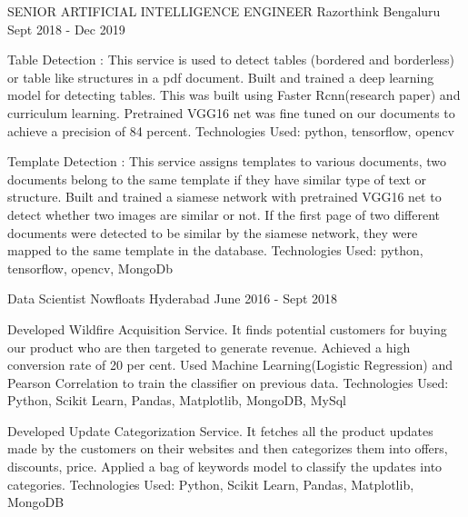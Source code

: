 \begin{cventries}
\vspace{2em} %
  \cventry
    {SENIOR ARTIFICIAL INTELLIGENCE ENGINEER} %
    {Razorthink} %
    {Bengaluru} %
    {Sept 2018 - Dec 2019} %
    {
      \begin{cvitems} %
        \item{Table Detection : This service is used to detect tables (bordered and borderless) or table like structures in a pdf document. Built and trained a deep learning model for detecting tables. This was built using Faster Rcnn(research paper) and curriculum learning. Pretrained VGG16 net was fine tuned on our documents to achieve a precision of 84 percent.  Technologies Used: python, tensorflow, opencv}        
        \item{Template Detection : This service assigns templates to various documents, two documents belong to the same template if they have similar type of text or structure. Built and trained a siamese network with pretrained VGG16 net to detect whether two images are similar or not. If the first page of two different documents were detected to be similar by the siamese network, they were mapped to the same template in the database. Technologies Used: python, tensorflow, opencv, MongoDb}        
	\end{cvitems}
    }
\vspace{2em} %
  \cventry
    {Data Scientist} %
    {Nowfloats} %
    {Hyderabad} %
    {June 2016 - Sept 2018} %
    {
      \begin{cvitems} %
        \item {Developed Wildfire Acquisition Service. It finds potential customers for buying our product who are then targeted to generate revenue. Achieved a high conversion rate of 20 per cent. Used Machine Learning(Logistic Regression) and Pearson Correlation to train the classifier on previous data. Technologies Used: Python, Scikit Learn, Pandas, Matplotlib, MongoDB, MySql  }
        \item {Developed Update Categorization Service. It fetches all the product updates made by the customers on their websites and then categorizes them into offers, discounts, price. Applied a bag of keywords model to classify the updates into categories. Technologies Used: Python, Scikit Learn, Pandas, Matplotlib, MongoDB  }
      \end{cvitems}
    }

\end{cventries}